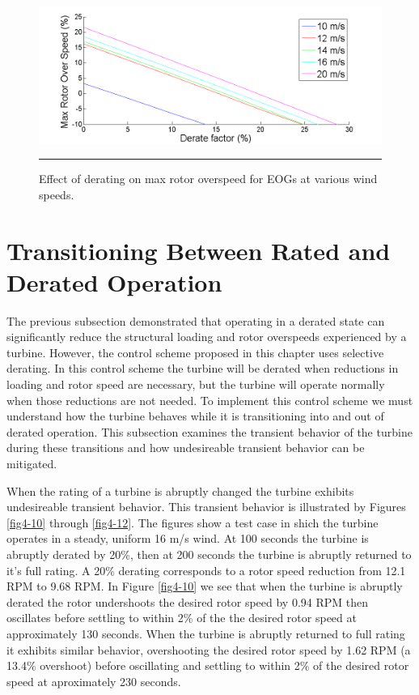 \begin{figure}[htbp]
	\centering
		\includegraphics[trim = {1cm 0 2cm 0}, clip, width = \linewidth]{Figures/ch4Figures/fig4-9.png}
		\rule{35em}{0.5pt}
	\caption{Effect of derating on max rotor overspeed for EOGs at various wind speeds.}
	\label{fig4-9}
\end{figure}



\section{Transitioning Between Rated and Derated Operation} \label{section4-4}


The previous subsection demonstrated that operating in a derated state can significantly reduce the structural loading and rotor overspeeds experienced by a turbine. However, the control scheme proposed in this chapter uses selective derating. In this control scheme the turbine will be derated when reductions in loading and rotor speed are necessary, but the turbine will operate normally when those reductions are not needed. To implement this control scheme we must understand how the turbine behaves while it is transitioning into and out of derated operation. This subsection examines the transient behavior of the turbine during these transitions and how undesireable transient behavior can be mitigated.

 When the rating of a turbine is abruptly changed the turbine exhibits undesireable transient behavior. This transient behavior is illustrated by Figures \ref{fig4-10} through \ref{fig4-12}. The figures show a test case in shich the turbine operates in a steady, uniform 16 m/s wind. At 100 seconds the turbine is abruptly derated by 20\%, then at 200 seconds the turbine is abruptly returned to it's full rating. A 20\% derating corresponds to a rotor speed reduction from 12.1 RPM to 9.68 RPM. In Figure \ref{fig4-10} we see that when the turbine is abruptly derated the rotor undershoots the desired rotor speed by 0.94 RPM then oscillates before settling to within 2\% of the the desired rotor speed at approximately 130 seconds. When the turbine is abruptly returned to full rating it exhibits similar behavior, overshooting the desired rotor speed by 1.62 RPM (a 13.4\% overshoot) before oscillating and settling to within 2\% of the desired rotor speed at aproximately 230 seconds. 


